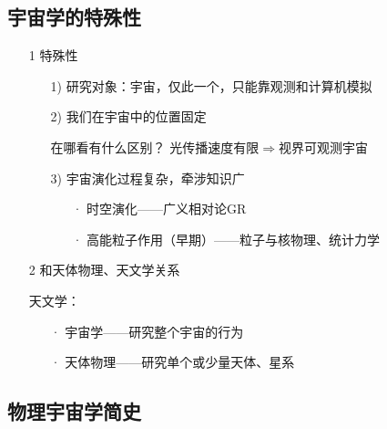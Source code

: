 \subsection{宇宙学的特殊性}
\begin{itemize}
	\item[1] 特殊性
	\begin{itemize}
		\item[1)] 研究对象：宇宙，仅此一个，只能靠观测和计算机模拟
		\item[2)] 我们在宇宙中的位置固定
			\begin{cbox}{在哪看有什么区别？}
				光传播速度有限$\Rightarrow$视界\quad 可观测宇宙
			\end{cbox}
		\item[3)] 宇宙演化过程复杂，牵涉知识广 
		\begin{itemize}
			\item[·] 时空演化——广义相对论GR
			\item[·] 高能粒子作用（早期）——粒子与核物理、统计力学
		\end{itemize}
	\end{itemize}
	\item[2] 和天体物理、天文学关系
	\par 天文学：
	\begin{itemize}
		\item[·] 宇宙学——研究整个宇宙的行为
		\item[·] 天体物理——研究单个或少量天体、星系
	\end{itemize}
\end{itemize}

\subsection{物理宇宙学简史}
